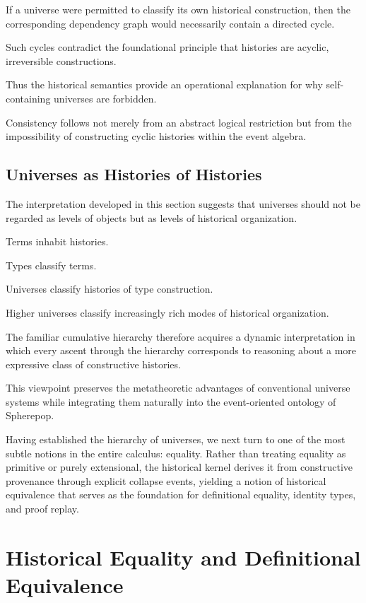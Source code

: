 \documentclass[12pt,oneside]{article}
\theoremstyle{definition}
\theoremstyle{remark}
\begin{document}
If a universe were permitted to classify its own historical construction, then
the corresponding dependency graph would necessarily contain a directed cycle.

Such cycles contradict the foundational principle that histories are acyclic,
irreversible constructions.

Thus the historical semantics provide an operational explanation for why
self-containing universes are forbidden.

Consistency follows not merely from an abstract logical restriction but from the
impossibility of constructing cyclic histories within the event algebra.

\subsection{Universes as Histories of Histories}

The interpretation developed in this section suggests that universes should not
be regarded as levels of objects but as levels of historical organization.

Terms inhabit histories.

Types classify terms.

Universes classify histories of type construction.

Higher universes classify increasingly rich modes of historical organization.

The familiar cumulative hierarchy therefore acquires a dynamic interpretation in
which every ascent through the hierarchy corresponds to reasoning about a more
expressive class of constructive histories.

This viewpoint preserves the metatheoretic advantages of conventional universe
systems while integrating them naturally into the event-oriented ontology of
Spherepop.

Having established the hierarchy of universes, we next turn to one of the most
subtle notions in the entire calculus: equality. Rather than treating equality
as primitive or purely extensional, the historical kernel derives it from
constructive provenance through explicit collapse events, yielding a notion of
historical equivalence that serves as the foundation for definitional equality,
identity types, and proof replay.

\section{Historical Equality and Definitional Equivalence}
\end{document}
